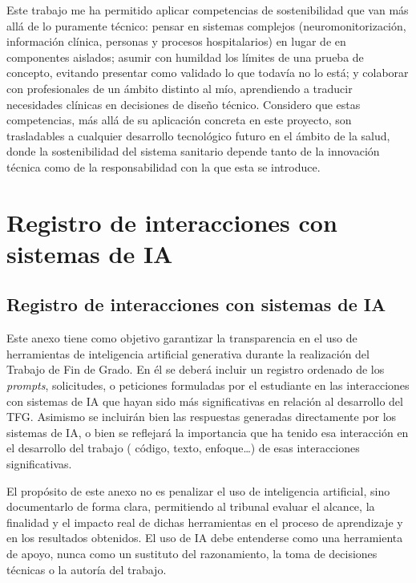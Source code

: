 \documentclass[
  spanish,
  a4paper,
  12pt,
  twoside]{memoir}
\newcommand{\apendice}[1]{\chapter{#1}}
\begin{document}
Este trabajo me ha permitido aplicar competencias de sostenibilidad que
van más allá de lo puramente técnico: pensar en sistemas complejos
(neuromonitorización, información clínica, personas y procesos
hospitalarios) en lugar de en componentes aislados; asumir con humildad
los límites de una prueba de concepto, evitando presentar como validado
lo que todavía no lo está; y colaborar con profesionales de un ámbito
distinto al mío, aprendiendo a traducir necesidades clínicas en
decisiones de diseño técnico. Considero que estas competencias, más allá
de su aplicación concreta en este proyecto, son trasladables a cualquier
desarrollo tecnológico futuro en el ámbito de la salud, donde la
sostenibilidad del sistema sanitario depende tanto de la innovación
técnica como de la responsabilidad con la que esta se introduce.


\apendice{Registro de interacciones con sistemas de IA}

\section{Registro de interacciones con sistemas de IA}

Este anexo tiene como objetivo garantizar la transparencia en el uso de
herramientas de inteligencia artificial generativa durante la
realización del Trabajo de Fin de Grado. En él se deberá incluir un
registro ordenado de los \textit{prompts}, solicitudes, o peticiones
formuladas por el estudiante en las interacciones con sistemas de IA que
hayan sido más significativas en relación al desarrollo del TFG.
Asimismo se incluirán bien las respuestas generadas directamente por los
sistemas de IA, o bien se reflejará la importancia que ha tenido esa
interacción en el desarrollo del trabajo ( código, texto, enfoque\ldots)
de esas interacciones significativas.

El propósito de este anexo no es penalizar el uso de inteligencia
artificial, sino documentarlo de forma clara, permitiendo al tribunal
evaluar el alcance, la finalidad y el impacto real de dichas
herramientas en el proceso de aprendizaje y en los resultados obtenidos.
El uso de IA debe entenderse como una herramienta de apoyo, nunca como
un sustituto del razonamiento, la toma de decisiones técnicas o la
autoría del trabajo.
\end{document}
